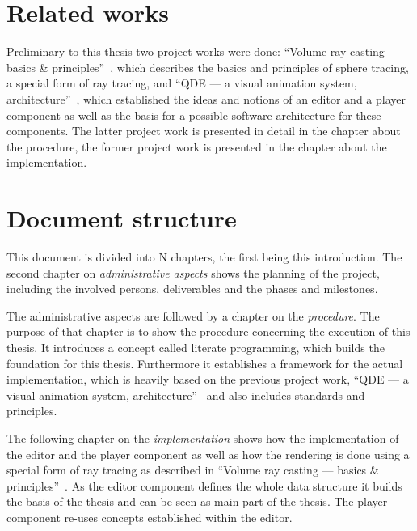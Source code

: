 \documentclass[
    a4paper,      %
    10pt,         %
    openright,    %
    notitlepage,  %
    parskip=half, %
]{scrreprt}       %
\theoremstyle{definition}                    %
\begin{document}
\blindtext{}

\section{Related works}
\label{sec:related-works}

Preliminary to this thesis two project works were done: ``Volume
ray casting --- basics \& principles''~\cite{osterwalder_volume_2016}, which
describes the basics and principles of sphere tracing, a special form of ray
tracing, and ``QDE --- a visual animation system,
architecture''~\cite{osterwalder_qde_2016}, which established the ideas and
notions of an editor and a player component as well as the basis for a possible
software architecture for these components. The latter project work is presented
in detail in the chapter about the procedure, the former project work is
presented in the chapter about the implementation.

\section{Document structure}
\label{sec:document-structure}

This document is divided into N chapters, the first being this introduction. The
second chapter on \textit{administrative aspects} shows the planning of the
project, including the involved persons, deliverables and the phases and
milestones.

The administrative aspects are followed by a chapter on the \textit{procedure}.
The purpose of that chapter is to show the procedure concerning the execution of
this thesis. It introduces a concept called literate programming, which builds
the foundation for this thesis. Furthermore it establishes a framework for the
actual implementation, which is heavily based on the previous project work,
``QDE --- a visual animation system, architecture''~\cite{osterwalder_qde_2016}
and also includes standards and principles.

The following chapter on the \textit{implementation} shows how the
implementation of the editor and the player component as well as how the
rendering is done using a special form of ray tracing as described in ``Volume
ray casting --- basics \& principles''~\cite{osterwalder_volume_2016}. As the
editor component defines the whole data structure it builds the basis of the
thesis and can be seen as main part of the thesis. The player component re-uses
concepts established within the editor.
\end{document}
